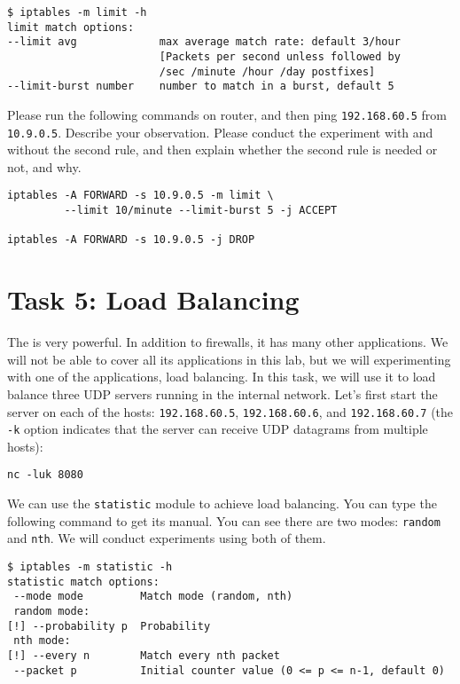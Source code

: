 \begin{lstlisting}
$ iptables -m limit -h
limit match options:
--limit avg             max average match rate: default 3/hour
                        [Packets per second unless followed by
                        /sec /minute /hour /day postfixes]
--limit-burst number    number to match in a burst, default 5
\end{lstlisting}
 

Please run the following commands on router, and then
ping \texttt{192.168.60.5} from \texttt{10.9.0.5}.  
Describe your observation. 
Please conduct the experiment with and without the second rule, 
and then explain whether the second rule is needed or not, and why.

\begin{lstlisting}
iptables -A FORWARD -s 10.9.0.5 -m limit \
         --limit 10/minute --limit-burst 5 -j ACCEPT

iptables -A FORWARD -s 10.9.0.5 -j DROP
\end{lstlisting}



\section{Task 5: Load Balancing}

The \iptables is very powerful. In addition to firewalls,
it has many other applications. We will not be able to 
cover all its applications in this lab, but we will experimenting
with one of the applications, load balancing. In this task,
we will use it to load balance three UDP servers running in the 
internal network. Let's first start the server
on each of the hosts: \texttt{192.168.60.5}, \texttt{192.168.60.6}, and 
\texttt{192.168.60.7} (the \texttt{-k} option indicates that 
the server can receive UDP datagrams from multiple hosts):

\begin{lstlisting}
nc -luk 8080
\end{lstlisting}

We can use the \texttt{statistic} module to achieve load balancing. 
You can type the following command to get its manual. You can 
see there are two modes: \texttt{random} and \texttt{nth}. 
We will conduct experiments using both of them.

\begin{lstlisting}
$ iptables -m statistic -h 
statistic match options:
 --mode mode         Match mode (random, nth)
 random mode:
[!] --probability p  Probability
 nth mode:
[!] --every n        Match every nth packet
 --packet p          Initial counter value (0 <= p <= n-1, default 0)
\end{lstlisting}
 

